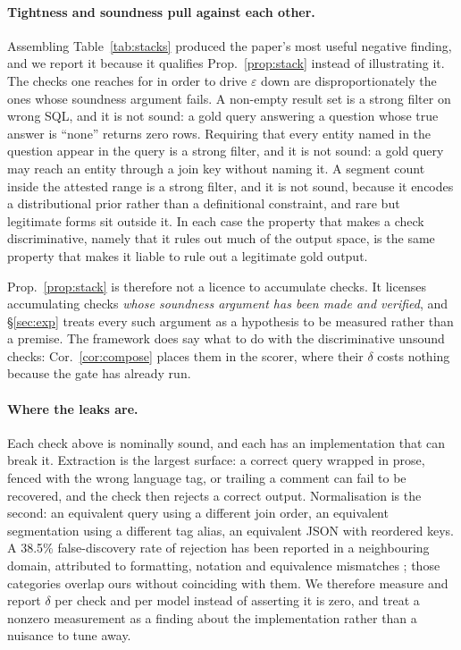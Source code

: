 \documentclass[11pt]{article}
\begin{document}
\paragraph{Tightness and soundness pull against each other.} Assembling Table~\ref{tab:stacks} produced the paper's most useful negative finding, and we report it because it qualifies Prop.~\ref{prop:stack} instead of illustrating it. The checks one reaches for in order to drive $\varepsilon$ down are disproportionately the ones whose soundness argument fails. A non-empty result set is a strong filter on wrong SQL, and it is not sound: a gold query answering a question whose true answer is ``none'' returns zero rows. Requiring that every entity named in the question appear in the query is a strong filter, and it is not sound: a gold query may reach an entity through a join key without naming it. A segment count inside the attested range is a strong filter, and it is not sound, because it encodes a distributional prior rather than a definitional constraint, and rare but legitimate forms sit outside it. In each case the property that makes a check discriminative, namely that it rules out much of the output space, is the same property that makes it liable to rule out a legitimate gold output.

Prop.~\ref{prop:stack} is therefore not a licence to accumulate checks. It licenses accumulating checks \emph{whose soundness argument has been made and verified}, and \S\ref{sec:exp} treats every such argument as a hypothesis to be measured rather than a premise. The framework does say what to do with the discriminative unsound checks: Cor.~\ref{cor:compose} places them in the scorer, where their $\delta$ costs nothing because the gate has already run.

\paragraph{Where the leaks are.} Each check above is nominally sound, and each has an implementation that can break it. Extraction is the largest surface: a correct query wrapped in prose, fenced with the wrong language tag, or trailing a comment can fail to be recovered, and the check then rejects a correct output. Normalisation is the second: an equivalent query using a different join order, an equivalent segmentation using a different tag alias, an equivalent JSON with reordered keys. A 38.5\% false-discovery rate of rejection has been reported in a neighbouring domain, attributed to formatting, notation and equivalence mismatches \citep{tinyv2025}; those categories overlap ours without coinciding with them. We therefore measure and report $\delta$ per check and per model instead of asserting it is zero, and treat a nonzero measurement as a finding about the implementation rather than a nuisance to tune away.
\end{document}
